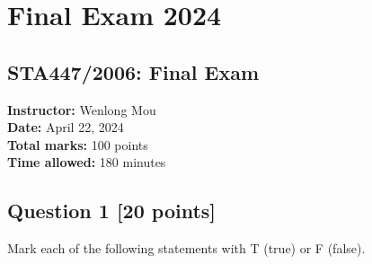 \documentclass[11pt]{article}
\theoremstyle{definition}
\begin{document}
\clearpage
\clearpage
\section{Final Exam 2024}

\subsection*{STA447/2006: Final Exam}
\textbf{Instructor:} Wenlong Mou\\
\textbf{Date:} April 22, 2024\\
\textbf{Total marks:} 100 points\\
\textbf{Time allowed:} 180 minutes

\subsection*{Question 1 \hfill [20 points]}
Mark each of the following statements with T (true) or F (false).
\end{document}
